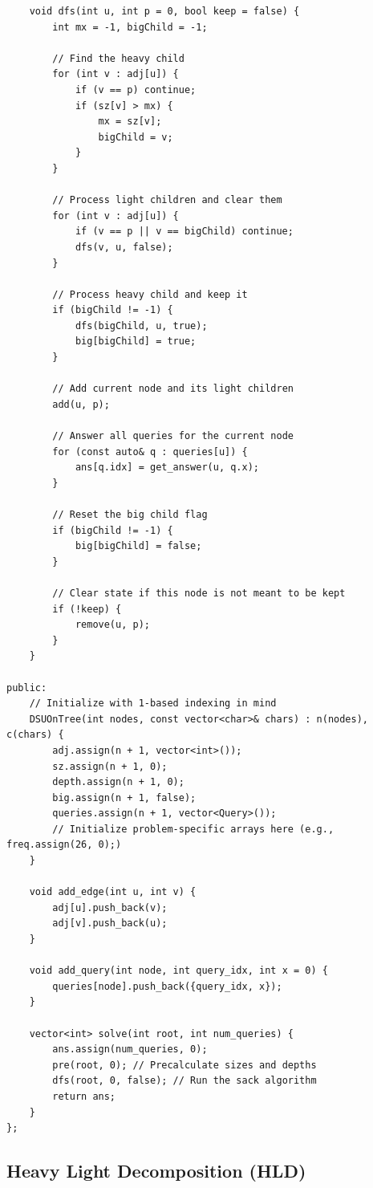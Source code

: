 \documentclass[9pt,a4paper,twocolumn]{extarticle}
\begin{document}
\begin{lstlisting}
    void dfs(int u, int p = 0, bool keep = false) {
        int mx = -1, bigChild = -1;
        
        // Find the heavy child
        for (int v : adj[u]) {
            if (v == p) continue;
            if (sz[v] > mx) {
                mx = sz[v];
                bigChild = v;
            }
        }

        // Process light children and clear them
        for (int v : adj[u]) {
            if (v == p || v == bigChild) continue;
            dfs(v, u, false);
        }

        // Process heavy child and keep it
        if (bigChild != -1) {
            dfs(bigChild, u, true);
            big[bigChild] = true; 
        }

        // Add current node and its light children
        add(u, p);
        
        // Answer all queries for the current node
        for (const auto& q : queries[u]) {
            ans[q.idx] = get_answer(u, q.x);
        }

        // Reset the big child flag
        if (bigChild != -1) {
            big[bigChild] = false;
        }

        // Clear state if this node is not meant to be kept
        if (!keep) {
            remove(u, p);
        }
    }

public:
    // Initialize with 1-based indexing in mind
    DSUOnTree(int nodes, const vector<char>& chars) : n(nodes), c(chars) {
        adj.assign(n + 1, vector<int>());
        sz.assign(n + 1, 0);
        depth.assign(n + 1, 0);
        big.assign(n + 1, false);
        queries.assign(n + 1, vector<Query>());
        // Initialize problem-specific arrays here (e.g., freq.assign(26, 0);)
    }

    void add_edge(int u, int v) {
        adj[u].push_back(v);
        adj[v].push_back(u);
    }

    void add_query(int node, int query_idx, int x = 0) {
        queries[node].push_back({query_idx, x});
    }

    vector<int> solve(int root, int num_queries) {
        ans.assign(num_queries, 0);
        pre(root, 0); // Precalculate sizes and depths
        dfs(root, 0, false); // Run the sack algorithm
        return ans;
    }
};
\end{lstlisting}

\subsection{Heavy Light Decomposition (HLD)}
\end{document}
